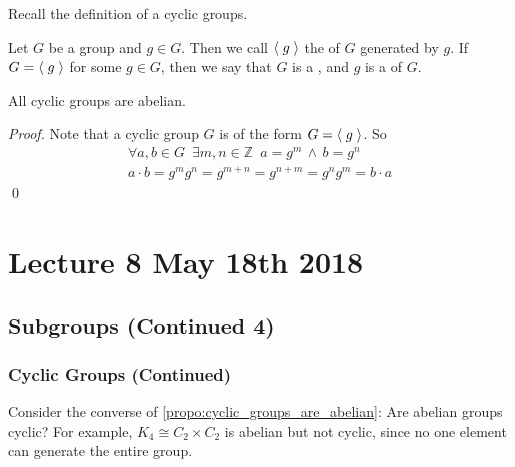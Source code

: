 \documentclass[notoc,notitlepage]{tufte-book}
\begin{document}
Recall the definition of a cyclic groups.

\begin{defn*}
  Let $G$ be a group and $g \in G$. Then we call $\langle \; g \; \rangle$ the  of $G$ generated by $g$. If $G = \langle \; g \; \rangle$ for some $g \in G$, then we say that $G$ is a , and $g$ is a  of $G$.
\end{defn*}

\begin{propo}
\label{propo:cyclic_groups_are_abelian}
  All cyclic groups are abelian.
\end{propo}

\begin{proof}
  Note that a cyclic group $G$ is of the form $G = \langle \; g \; \rangle$. So
  \begin{gather*}
    \forall a, b \in G \enspace \exists m, n \in \mathbb{Z} \enspace a = g^m \, \land \, b = g^n \\
    a \cdot b = g^m g^n = g^{m + n} = g^{n + m} = g^n g^m = b \cdot a
  \end{gather*}\qed
\end{proof}




\chapter{Lecture 8 May 18th 2018}%
\label{chp:lecture_8_may_18th_2018}

\section{Subgroups (Continued 4)}%
\label{sec:subgroups_continued_4}

\subsection{Cyclic Groups (Continued)}%
\label{sub:cyclic_groups_continued}

\begin{note}
  Consider the converse of \cref{propo:cyclic_groups_are_abelian}: Are abelian groups cyclic?  For example, $K_4 \cong C_2 \times C_2$ is abelian but not cyclic, since no one element can generate the entire group.
\end{note}
\end{document}
